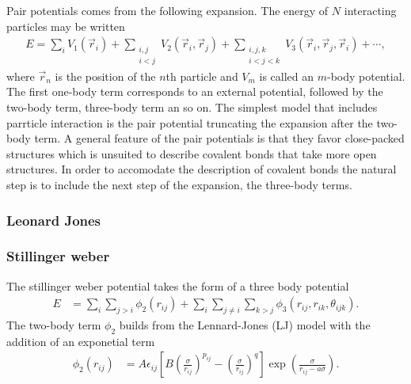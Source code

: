 Pair potentials comes from the following expansion. The energy of $N$ interacting particles may be written 
\begin{align*}
  E = \sum_i V_1(\vec{r}_i) + 
      \sum_{\substack{i, j \\ i < j}} V_2(\vec{r}_i, \vec{r}_j) +  
      \sum_{\substack{i,j,k \\ i < j < k}} V_3(\vec{r}_i, \vec{r}_j, \vec{r}_i) + \cdots,
\end{align*}
where $\vec{r}_n$ is the position of the $n$th particle and $V_m$ is called an $m$-body potential.
The first one-body term corresponds to an external potential, followed by the two-body term, three-body term an so on. The simplest model that includes parrticle interaction is the pair potential truncating the expansion after the two-body term. A general feature of the pair potentials is that they favor close-packed structures which is unsuited to describe covalent bonds that take more open structures. In order to accomodate the description of covalent bonds the natural step is to include the next step of the expansion, the three-body terms. 

\subsubsection{Leonard Jones}



\subsubsection{Stillinger weber}

The stillinger weber potential takes the form of a three body potential
\begin{align*}
  E &=\sum_i \sum_{j>i} \phi_2(r_{i j})+\sum_i \sum_{j \neq i} \sum_{k>j} \phi_3(r_{ij}, r_{ik}, \theta_{ijk}).
\end{align*}
The two-body term $\phi_2$ builds from the Lennard-Jones (LJ) model with the addition of an exponetial term
\begin{align*}
  \phi_2(r_{i j}) & =A \epsilon_{ij}\left[B\left(\frac{\sigma}{r_{ij}}\right)^{p_{ij}} - \left(\frac{\sigma}{r_{ij}}\right)^{q}\right] \exp (\frac{\sigma}{r_{ij}-a \sigma}).
\end{align*}

